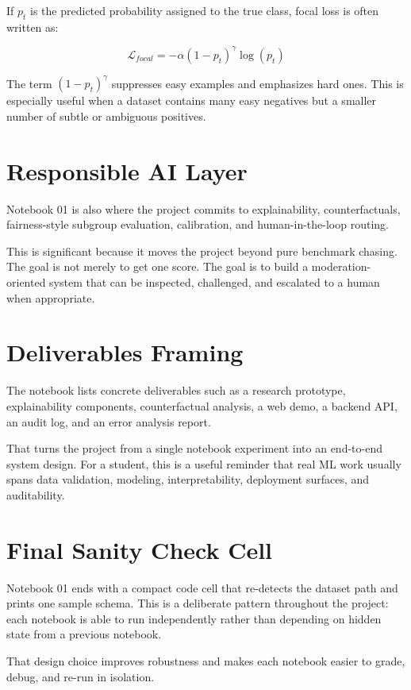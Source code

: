 \documentclass[11pt,a4paper]{report}
\begin{document}
If $p_t$ is the predicted probability assigned to the true class, focal loss is often written as:

\[
\mathcal{L}_{focal} = -\alpha (1-p_t)^{\gamma} \log(p_t)
\]

The term $(1-p_t)^{\gamma}$ suppresses easy examples and emphasizes hard ones. This is especially useful when a dataset contains many easy negatives but a smaller number of subtle or ambiguous positives.

\section{Responsible AI Layer}

Notebook 01 is also where the project commits to explainability, counterfactuals, fairness-style subgroup evaluation, calibration, and human-in-the-loop routing.

This is significant because it moves the project beyond pure benchmark chasing. The goal is not merely to get one score. The goal is to build a moderation-oriented system that can be inspected, challenged, and escalated to a human when appropriate.

\section{Deliverables Framing}

The notebook lists concrete deliverables such as a research prototype, explainability components, counterfactual analysis, a web demo, a backend API, an audit log, and an error analysis report.

That turns the project from a single notebook experiment into an end-to-end system design. For a student, this is a useful reminder that real ML work usually spans data validation, modeling, interpretability, deployment surfaces, and auditability.

\section{Final Sanity Check Cell}

Notebook 01 ends with a compact code cell that re-detects the dataset path and prints one sample schema. This is a deliberate pattern throughout the project: each notebook is able to run independently rather than depending on hidden state from a previous notebook.

That design choice improves robustness and makes each notebook easier to grade, debug, and re-run in isolation.
\end{document}
